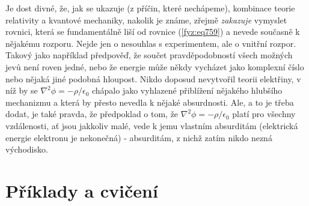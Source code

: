     Je dost divné, že, jak se ukazuje (z příčin, které nechápeme), kombinace teorie relativity a
    kvantové mechaniky, nakolik je známe, zřejmě \emph{zakazuje} vymyslet rovnici, která se
    fundamentálně liší od rovnice (\ref{fyz:eq759}) a nevede současně k nějakému rozporu. Nejde jen
    o nesouhlas s experimentem, ale o vnitřní rozpor. Takový jako například předpověď, že součet
    pravděpodobností všech možných jevů není roven jedné, nebo že energie může někdy vycházet jako
    komplexní číslo nebo nějaká jiné podobná hloupost. Nikdo doposud nevytvořil teorii elektřiny, v
    níž by se \(∇^2ϕ=−ρ/ϵ_0\) chápalo jako vyhlazené přiblížení nějakého hlubšího mechanizmu a která
    by přesto nevedla k nějaké absurdnosti. Ale, a to je třeba dodat, je také pravda, že předpoklad
    o tom, že \(∇^2ϕ=−ρ/ϵ_0\) platí pro všechny vzdálenosti, ať jsou jakkoliv malé, vede k jemu
    vlastním absurditám (elektrická energie elektronu je nekonečná) - absurditám, z nichž zatím
    nikdo nezná východisko.
  
  \section{Příklady a cvičení}\label{fyz:IIchapXIIsecVIII}
